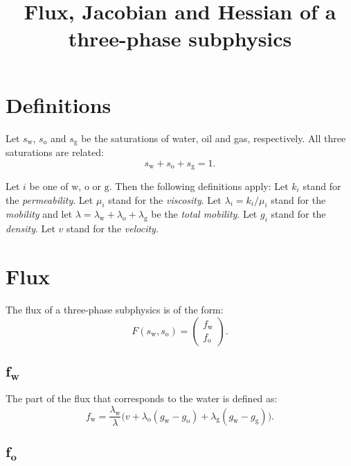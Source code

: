 \documentclass{article}
\title{Flux, Jacobian and Hessian of a three-phase subphysics}
\author{}
\date{}
\newcommand{\water}{\text{w}}
\newcommand{\oil}{\text{o}}
\newcommand{\gas}{\text{g}}
\begin{document}
\maketitle

\section{Definitions}


Let $s_\water$, $s_\oil$ and $s_\gas$ be the saturations of water, oil and gas, respectively.
All three saturations are related:
\begin{equation}\label{saturations}
s_\water + s_\oil + s_\gas = 1.
\end{equation}

Let $i$ be one of $\water$, $\oil$ or $\gas$. Then the following definitions apply:
Let $k_i$ stand for the {\em permeability}.
Let $\mu_i$ stand for the {\em viscosity}.
Let $\lambda_i = k_i/\mu_i$ stand for the {\em mobility} and let $\lambda = \lambda_\water + \lambda_\oil + \lambda_\gas$ be the {\em total mobility}.
Let $g_i$ stand for the {\em density}.
Let $v$ stand for the {\em velocity}.

\section{Flux}
The flux of a three-phase subphysics is of the form:
\begin{equation}\label{flux}
F(s_\water, s_\oil) = \left(
\begin{array}{c}
f_\water \\
f_\oil
\end{array}
\right).
\end{equation}

\subsection{$\boldsymbol{f_\water}$}\label{water_flux}

The part of the flux that corresponds to the water is defined as:
\begin{equation}\label{fw}
f_\water = \frac{\lambda_\water}{\lambda} \bigl( v + \lambda_\oil(g_\water - g_\oil) + \lambda_\gas(g_\water - g_\gas) \bigr).
\end{equation}

\subsection{$\boldsymbol{f_\oil}$}\label{oil_flux}
\end{document}
